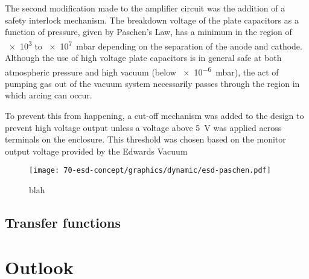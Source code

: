 The second modification made to the amplifier circuit was the addition of a safety interlock mechanism. The breakdown voltage of the plate capacitors as a function of pressure, given by Paschen's Law, has a minimum in the region of \SI{e3}{} to \SI{e7}{\milli\bar} depending on the separation of the anode and cathode. Although the use of high voltage plate capacitors is in general safe at both atmospheric pressure and high vacuum (below \SI{e-6}{\milli\bar}), the act of pumping gas out of the vacuum system necessarily passes through the region in which arcing can occur.

To prevent this from happening, a cut-off mechanism was added to the design to prevent high voltage output unless a voltage above \SI{5}{\volt} was applied across terminals on the enclosure. This threshold was chosen based on the monitor output voltage provided by the Edwards Vacuum

\begin{figure}
  \begin{center}
    \texttt{[image: 70-esd-concept/graphics/dynamic/esd-paschen.pdf]}
    \caption{blah}
    \label{fig:esd-paschen}
  \end{center}
\end{figure}

\subsection{Transfer functions}

\section{Outlook}